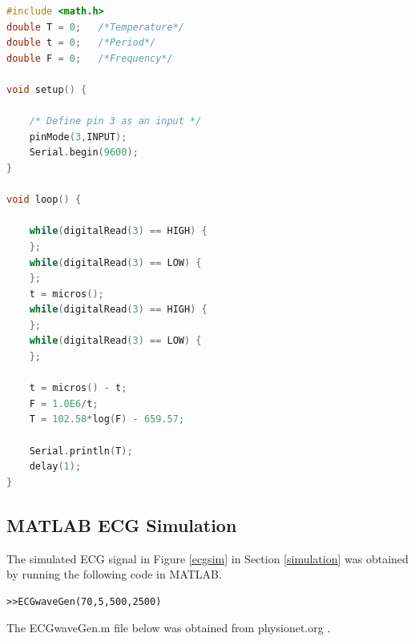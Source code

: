 \begin{lstlisting}[language=c]
#include <math.h>
double T = 0;  	/*Temperature*/
double t = 0;	/*Period*/
double F = 0;	/*Frequency*/

void setup() {

	/* Define pin 3 as an input */
	pinMode(3,INPUT);
	Serial.begin(9600); 
}

void loop() {

	while(digitalRead(3) == HIGH) {
	}; 
	while(digitalRead(3) == LOW) {
	};
	t = micros();
	while(digitalRead(3) == HIGH) {
	};
	while(digitalRead(3) == LOW) {
	}; 

	t = micros() - t;
	F = 1.0E6/t;
	T = 102.58*log(F) - 659.57; 

	Serial.println(T); 
	delay(1); 
}

\end{lstlisting}

\subsection{MATLAB ECG Simulation}
\label{ecgsimulationcode}

The simulated ECG signal in Figure \ref{ecgsim} in Section \ref{simulation} was obtained by running the following code in MATLAB.

\begin{lstlisting}
>>ECGwaveGen(70,5,500,2500)
\end{lstlisting}

The ECGwaveGen.m file below was obtained from physionet.org \cite{ecgsimulation}.

